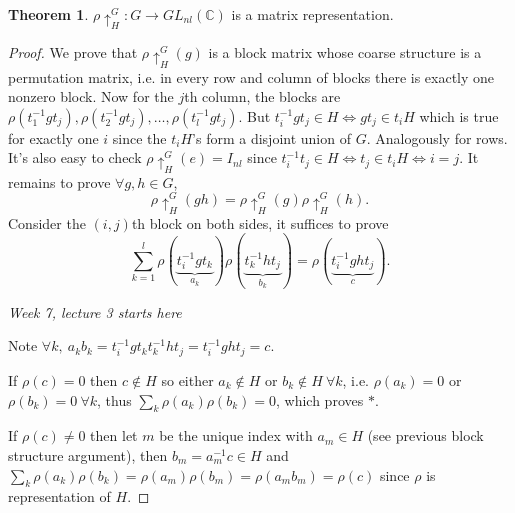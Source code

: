 \documentclass[a4paper]{article}
\newcommand{\C}{\mathbb{C}}
\theoremstyle{definition}
\newtheorem{thm}[defn]{Theorem}
\begin{document}
\begin{thm}
$\rho\uparrow_H^G:G\rightarrow GL_{nl}(\C)$ is a matrix representation.
\end{thm}
\begin{proof}
We prove that $\rho\uparrow_H^G(g)$ is a block matrix whose coarse structure is a permutation matrix, i.e. in every row and column of blocks there is exactly one nonzero block. Now for the $j$th column, the blocks are $\rho(t_1^{-1}gt_j),\rho(t_2^{-1}gt_j),\ldots,\rho(t_l^{-1}gt_j)$. But $t_i^{-1}gt_j\in H\iff gt_j\in t_iH$ which is true for exactly one $i$ since the $t_iH$'s form a disjoint union of $G$. Analogously for rows. It's also easy to check $\rho\uparrow_H^G(e)=I_{nl}$ since $t_i^{-1}t_j\in H\iff t_j\in t_iH\iff i=j$. It remains to prove $\forall g,h\in G$,
\[
\rho\uparrow_H^G(gh)=\rho\uparrow_H^G(g)\rho\uparrow_H^G(h).
\]
Consider the $(i,j)$th block on both sides, it suffices to prove
\[
\tag{$\ast$}
\sum_{k=1}^l\rho(\underbrace{t_i^{-1}gt_k}_{a_k})\rho(\underbrace{t_k^{-1}ht_j}_{b_k})=\rho(\underbrace{t_i^{-1}ght_j}_{c}).
\]

\begin{flushright}
\textit{Week 7, lecture 3 starts here}
\end{flushright}

Note $\forall k,\ a_kb_k=t_i^{-1}gt_kt_k^{-1}ht_j=t_i^{-1}ght_j=c$.

If $\rho(c)=0$ then $c\notin H$ so either $a_k\notin H$ or $b_k\notin H \ \forall k$, i.e. $\rho(a_k)=0$ or $\rho(b_k)=0 \ \forall k$, thus $\sum_k \rho(a_k)\rho(b_k)=0$, which proves $\ast$.

If $\rho(c)\neq 0$ then let $m$ be the unique index with $a_m\in H$ (see previous block structure argument), then $b_m=a_m^{-1}c\in H$ and $\sum_k \rho(a_k)\rho(b_k)=\rho(a_m)\rho(b_m)=\rho(a_mb_m)=\rho(c)$ since $\rho$ is representation of $H$.
\end{proof}
\end{document}

